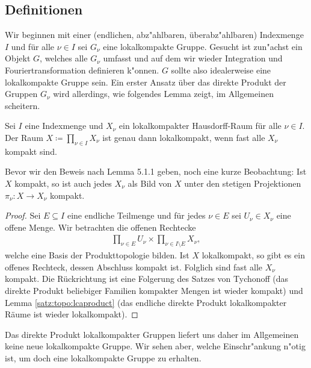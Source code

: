 \subsection{Definitionen}\label{kapitel:RDP}
		Wir beginnen mit einer (endlichen, abz"ahlbaren, überabz"ahlbaren) Indexmenge $I$ und für alle $\nu\in I$ sei $G_\nu$  eine lokalkompakte Gruppe.
		Gesucht ist zun"achst ein Objekt $G$, welches alle $G_\nu$ umfasst und auf dem wir wieder Integration und Fouriertransformation definieren k"onnen.
		$G$ sollte also idealerweise eine lokalkompakte Gruppe sein.
		Ein erster Ansatz über das direkte Produkt der Gruppen $G_\nu$ wird allerdings, wie folgendes Lemma zeigt, im Allgemeinen scheitern.
		\begin{lemma}\label{Lemma:lokalkompaktProd}
			Sei $I$ eine Indexmenge und $X_\nu$ ein lokalkompakter Hausdorff-Raum für alle $\nu \in I$. Der Raum $X\coloneqq \prod_{\nu \in I} X_\nu$ ist genau dann lokalkompakt, wenn fast alle $X_\nu$ kompakt sind.
		\end{lemma}
		Bevor wir den Beweis nach \textcite{deitmar2010} Lemma 5.1.1 geben, noch eine kurze Beobachtung: 
		Ist $X$ kompakt, so ist auch jedes $X_\nu$ als Bild von $X$ unter den stetigen Projektionen $\pi_\nu:X \to X_\nu$ kompakt.
		\begin{proof}
			Sei $E \subseteq I$ eine endliche Teilmenge und für jedes $\nu\in E$ sei $U_\nu \in X_\nu$ eine offene Menge. 
			Wir betrachten die offenen Rechtecke
			\begin{align*}
				\prod_{\nu\in E} U_\nu \times \prod_{\nu\in I\setminus E} X_\nu,
			\end{align*}
			welche eine Basis der Produkttopologie bilden. 
			Ist $X$ lokalkompakt, so gibt es ein offenes Rechteck, dessen Abschluss kompakt ist. 
			Folglich sind fast alle $X_\nu$ kompakt. 
			Die Rückrichtung ist eine Folgerung des Satzes von Tychonoff (das direkte Produkt beliebiger Familien kompakter Mengen ist wieder kompakt) und Lemma \ref{satz:topo:lcaproduct} (das endliche direkte Produkt lokalkompakter Räume ist wieder lokalkompakt).
		\end{proof}
		Das direkte Produkt lokalkompakter Gruppen liefert uns daher im Allgemeinen keine neue lokalkompakte Gruppe. 
		Wir sehen aber, welche Einschr"ankung n"otig ist, um doch eine lokalkompakte Gruppe zu erhalten.
